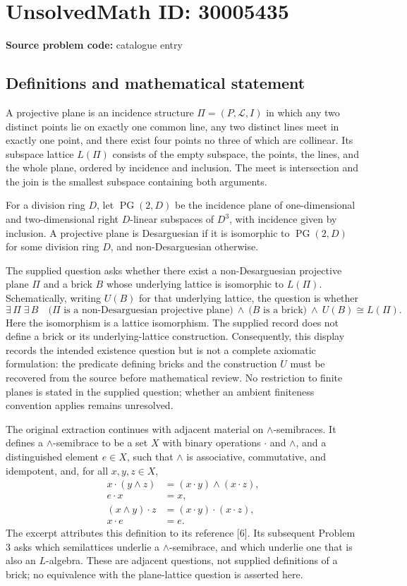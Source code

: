 \documentclass[11pt]{article}
\begin{document}
\section*{UnsolvedMath ID: 30005435}
\textbf{Source problem code:} catalogue entry
\subsection{Definitions and mathematical statement}
A projective plane is an incidence structure \(\Pi=(P,\mathcal L,I)\) in which any two distinct points lie on exactly one common line, any two distinct lines meet in exactly one point, and there exist four points no three of which are collinear. Its subspace lattice \(L(\Pi)\) consists of the empty subspace, the points, the lines, and the whole plane, ordered by incidence and inclusion. The meet is intersection and the join is the smallest subspace containing both arguments.

For a division ring \(D\), let \(\operatorname{PG}(2,D)\) be the incidence plane of one-dimensional and two-dimensional right \(D\)-linear subspaces of \(D^3\), with incidence given by inclusion. A projective plane is Desarguesian if it is isomorphic to \(\operatorname{PG}(2,D)\) for some division ring \(D\), and non-Desarguesian otherwise.

The supplied question asks whether there exist a non-Desarguesian projective plane \(\Pi\) and a brick \(B\) whose underlying lattice is isomorphic to \(L(\Pi)\). Schematically, writing \(U(B)\) for that underlying lattice, the question is whether
\[
\exists\,\Pi\;\exists\,B\quad
\bigl(\Pi\text{ is a non-Desarguesian projective plane}\bigr)
\ \land\ 
\bigl(B\text{ is a brick}\bigr)
\ \land\ 
U(B)\cong L(\Pi).
\]
Here the isomorphism is a lattice isomorphism. The supplied record does not define a brick or its underlying-lattice construction. Consequently, this display records the intended existence question but is not a complete axiomatic formulation: the predicate defining bricks and the construction \(U\) must be recovered from the source before mathematical review. No restriction to finite planes is stated in the supplied question; whether an ambient finiteness convention applies remains unresolved.

The original extraction continues with adjacent material on \(\wedge\)-semibraces. It defines a \(\wedge\)-semibrace to be a set \(X\) with binary operations \(\cdot\) and \(\wedge\), and a distinguished element \(e\in X\), such that \(\wedge\) is associative, commutative, and idempotent, and, for all \(x,y,z\in X\),
\[
\begin{aligned}
x\cdot(y\wedge z)&=(x\cdot y)\wedge(x\cdot z),\\
e\cdot x&=x,\\
(x\wedge y)\cdot z&=(x\cdot y)\cdot(x\cdot z),\\
x\cdot e&=e.
\end{aligned}
\]
The excerpt attributes this definition to its reference [6]. Its subsequent Problem 3 asks which semilattices underlie a \(\wedge\)-semibrace, and which underlie one that is also an \(L\)-algebra. These are adjacent questions, not supplied definitions of a brick; no equivalence with the plane-lattice question is asserted here.
\end{document}
